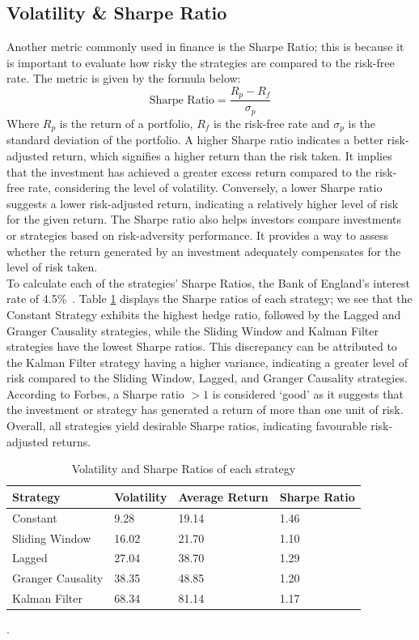 \subsection{Volatility \& Sharpe Ratio}


Another metric commonly used in finance is the Sharpe Ratio; this is because it is important to evaluate how risky the strategies are compared to the risk-free rate. The metric is given by the formula below:$$\text{Sharpe Ratio} = \frac{R_p - R_f}{\sigma_p}$$ Where $R_p$ is the return of a portfolio, $R_f$ is the risk-free rate and $\sigma_p$ is the standard deviation of the portfolio. A higher Sharpe ratio indicates a better risk-adjusted return, which signifies a higher return than the risk taken. It implies that the investment has achieved a greater excess return compared to the risk-free rate, considering the level of volatility. Conversely, a lower Sharpe ratio suggests a lower risk-adjusted return, indicating a relatively higher level of risk for the given return. The Sharpe ratio also helps investors compare investments or strategies based on risk-adversity performance. It provides a way to assess whether the return generated by an investment adequately compensates for the level of risk taken. 
\\[3mm]
To calculate each of the strategies' Sharpe Ratios, the Bank of England's interest rate of 4.5\%~\cite{boe_interest}. Table \ref{tab:sharpes} displays the Sharpe ratios of each strategy; we see that the Constant Strategy exhibits the highest hedge ratio, followed by the Lagged and Granger Causality strategies, while the Sliding Window and Kalman Filter strategies have the lowest Sharpe ratios. This discrepancy can be attributed to the Kalman Filter strategy having a higher variance, indicating a greater level of risk compared to the Sliding Window, Lagged, and Granger Causality strategies. According to Forbes, a Sharpe ratio $>1$ is considered `good' as it suggests that the investment or strategy has generated a return of more than one unit of risk. Overall, all strategies yield desirable Sharpe ratios, indicating favourable risk-adjusted returns.

\begin{table}[H]
    \centering
        \begin{tabular}{|p{7em}|p{7em}|p{7em}|p{7em}|}\hline
            Strategy & Volatility & Average Return & Sharpe Ratio \\\hline
            Constant & 9.28 & 19.14 & 1.46\\\hline
            Sliding Window & 16.02 & 21.70 & 1.10\\\hline
            Lagged & 27.04 & 38.70 & 1.29 \\\hline
            Granger Causality & 38.35 & 48.85 & 1.20\\\hline
            Kalman Filter & 68.34 & 81.14 & 1.17\\\hline
        \end{tabular}
    \caption{Volatility and Sharpe Ratios of each strategy \label{tab:sharpes}}.
\end{table}
\vspace{-6ex}
